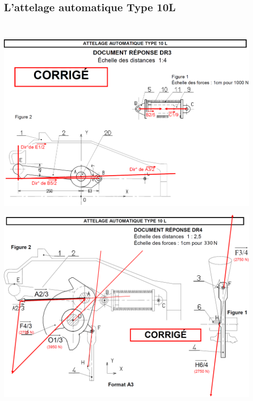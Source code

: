 \newpage

\subsection{L'attelage automatique Type 10L}

~\

\begin{center}
 \includegraphics[width=0.9\linewidth]{img/tgv1_cor}
\end{center}
 
\begin{center}
 \includegraphics[width=0.9\linewidth]{img/tgv2_cor}
\end{center}

